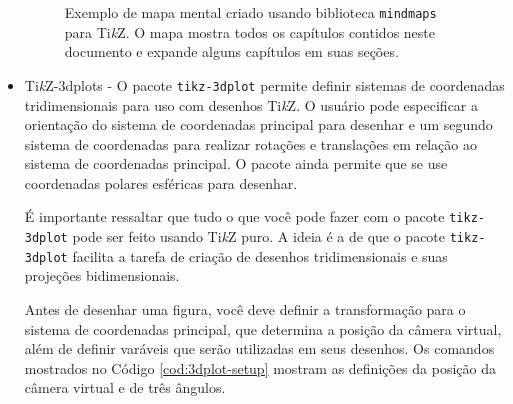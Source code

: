\begin{itemize}
\begin{figure}[htb]
\begin{center}
\end{center}
\caption{Exemplo de mapa mental criado usando biblioteca \texttt{mindmaps} para Ti\textit{k}Z. O mapa mostra todos os capítulos contidos neste documento e expande alguns capítulos em suas seções.}
\label{fig:mapamental}
\end{figure}

\item Ti\textit{k}Z-3dplots - O pacote \texttt{tikz-3dplot} permite definir sistemas de coordenadas tridimensionais para uso com desenhos Ti\textit{k}Z. O usuário pode especificar a orientação do sistema de coordenadas principal para desenhar e um segundo sistema de coordenadas para realizar rotações e translações em relação ao sistema de coordenadas principal. O pacote ainda permite que se use coordenadas polares esféricas para desenhar.

É importante ressaltar que tudo o que você pode fazer com o pacote \texttt{tikz-3dplot} pode ser feito usando Ti\textit{k}Z puro. A ideia é a de que o pacote \texttt{tikz-3dplot} facilita a tarefa de criação de desenhos tridimensionais e suas projeções bidimensionais. 

Antes de desenhar uma figura, você deve definir a transformação para o sistema de coordenadas principal, que determina a posição da câmera virtual, além de definir varáveis que serão utilizadas em seus desenhos. Os comandos mostrados no Código \ref{cod:3dplot-setup} mostram as definições da posição da câmera virtual e de três ângulos.


\end{itemize}
